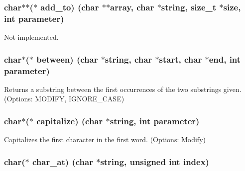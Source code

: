 \subsubsection[{add\+\_\+to}]{\setlength{\rightskip}{0pt plus 5cm}char$\ast$$\ast$($\ast$ add\+\_\+to) (char $\ast$$\ast$array, char $\ast$string, size\+\_\+t $\ast$size, int parameter)}\label{struct_string___utils_a0c2d1f4cb2b322fbf9f3d0c402549ff3}


Not implemented. 

\hypertarget{struct_string___utils_a66942fc862667d85616e0ce9acf4b2c9}{}
\subsubsection[{between}]{\setlength{\rightskip}{0pt plus 5cm}char$\ast$($\ast$ between) (char $\ast$string, char $\ast$start, char $\ast$end, int parameter)}\label{struct_string___utils_a66942fc862667d85616e0ce9acf4b2c9}


Returns a substring between the first occurrences of the two substrings given. (Options\+: M\+O\+D\+I\+F\+Y, I\+G\+N\+O\+R\+E\+\_\+\+C\+A\+S\+E) 

\hypertarget{struct_string___utils_a76ddd153562d3e5cc35b28e6cad86416}{}
\subsubsection[{capitalize}]{\setlength{\rightskip}{0pt plus 5cm}char$\ast$($\ast$ capitalize) (char $\ast$string, int parameter)}\label{struct_string___utils_a76ddd153562d3e5cc35b28e6cad86416}


Capitalizes the first character in the first word. (Options\+: Modify) 

\hypertarget{struct_string___utils_a165241eff2c5eaaf582e1e38f753d36a}{}
\subsubsection[{char\+\_\+at}]{\setlength{\rightskip}{0pt plus 5cm}char($\ast$ char\+\_\+at) (char $\ast$string, unsigned int index)}\label{struct_string___utils_a165241eff2c5eaaf582e1e38f753d36a}


